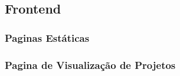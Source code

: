 \subsection{Frontend}

\subsubsection{Paginas Estáticas}

\subsubsection{Pagina de Visualização de Projetos}


